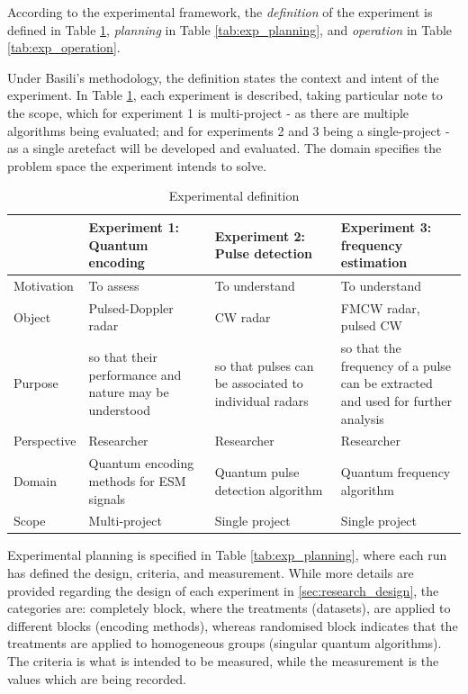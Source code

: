 According to the experimental framework, the \textit{definition} of the experiment is defined in Table \ref{tab:exp_definition}, \textit{planning} in Table \ref{tab:exp_planning}, and \textit{operation} in Table \ref{tab:exp_operation}.

Under Basili's methodology, the definition states the context and intent of the experiment.
In Table \ref{tab:exp_definition}, each experiment is described, taking particular note to the scope, which for experiment 1 is multi-project - as there are multiple algorithms being evaluated; and for experiments 2 and 3 being a single-project - as a single aretefact will be developed and evaluated.
The domain specifies the problem space the experiment intends to solve.


\begin{table}[ht]
\caption{Experimental definition}
\label{tab:exp_definition}
\begin{tabular}{p{0.16\linewidth}|p{0.28\linewidth}p{0.28\linewidth}p{0.28\linewidth}}
\hline
& Experiment 1: Quantum encoding & Experiment 2: Pulse detection & Experiment 3: frequency estimation \\
\hline
Motivation & To assess & To understand & To understand \\
Object & Pulsed-Doppler radar & \ac{CW} radar & \ac{FMCW} radar, pulsed \ac{CW} \\
Purpose & so that their performance and nature may be understood & so that pulses can be associated to individual radars & so that the frequency of a pulse can be extracted and used for further   analysis \\
Perspective & Researcher & Researcher & Researcher \\
Domain & Quantum encoding methods for ESM signals & Quantum pulse detection algorithm & Quantum frequency algorithm \\
Scope & Multi-project & Single project & Single project \\
\hline
\end{tabular}
\end{table}

Experimental planning is specified in Table \ref{tab:exp_planning}, where each run has defined the design, criteria, and measurement.
While more details are provided regarding the design of each experiment in \ref{sec:research_design}, the categories are: completely block, where the treatments (datasets), are applied to different blocks (encoding methods), whereas randomised block indicates that the treatments are applied to homogeneous groups (singular quantum algorithms).
The criteria is what is intended to be measured, while the measurement is the values which are being recorded.

